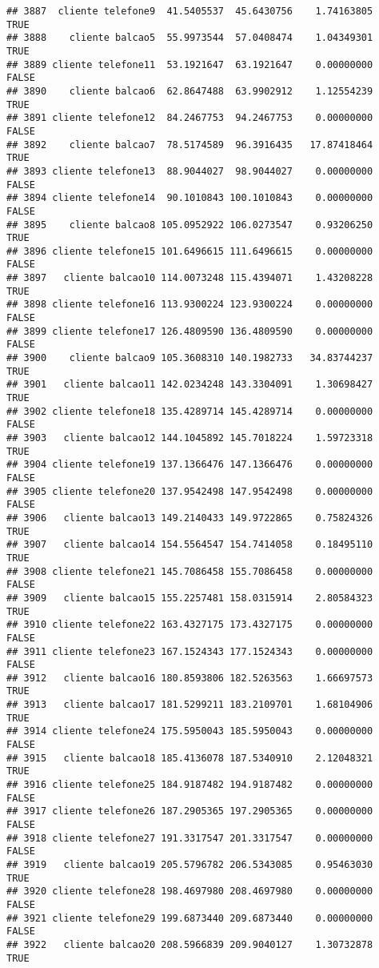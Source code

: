 \documentclass[
]{article}
\begin{document}
\begin{verbatim}
## 3887  cliente telefone9  41.5405537  45.6430756    1.74163805     TRUE
## 3888    cliente balcao5  55.9973544  57.0408474    1.04349301     TRUE
## 3889 cliente telefone11  53.1921647  63.1921647    0.00000000    FALSE
## 3890    cliente balcao6  62.8647488  63.9902912    1.12554239     TRUE
## 3891 cliente telefone12  84.2467753  94.2467753    0.00000000    FALSE
## 3892    cliente balcao7  78.5174589  96.3916435   17.87418464     TRUE
## 3893 cliente telefone13  88.9044027  98.9044027    0.00000000    FALSE
## 3894 cliente telefone14  90.1010843 100.1010843    0.00000000    FALSE
## 3895    cliente balcao8 105.0952922 106.0273547    0.93206250     TRUE
## 3896 cliente telefone15 101.6496615 111.6496615    0.00000000    FALSE
## 3897   cliente balcao10 114.0073248 115.4394071    1.43208228     TRUE
## 3898 cliente telefone16 113.9300224 123.9300224    0.00000000    FALSE
## 3899 cliente telefone17 126.4809590 136.4809590    0.00000000    FALSE
## 3900    cliente balcao9 105.3608310 140.1982733   34.83744237     TRUE
## 3901   cliente balcao11 142.0234248 143.3304091    1.30698427     TRUE
## 3902 cliente telefone18 135.4289714 145.4289714    0.00000000    FALSE
## 3903   cliente balcao12 144.1045892 145.7018224    1.59723318     TRUE
## 3904 cliente telefone19 137.1366476 147.1366476    0.00000000    FALSE
## 3905 cliente telefone20 137.9542498 147.9542498    0.00000000    FALSE
## 3906   cliente balcao13 149.2140433 149.9722865    0.75824326     TRUE
## 3907   cliente balcao14 154.5564547 154.7414058    0.18495110     TRUE
## 3908 cliente telefone21 145.7086458 155.7086458    0.00000000    FALSE
## 3909   cliente balcao15 155.2257481 158.0315914    2.80584323     TRUE
## 3910 cliente telefone22 163.4327175 173.4327175    0.00000000    FALSE
## 3911 cliente telefone23 167.1524343 177.1524343    0.00000000    FALSE
## 3912   cliente balcao16 180.8593806 182.5263563    1.66697573     TRUE
## 3913   cliente balcao17 181.5299211 183.2109701    1.68104906     TRUE
## 3914 cliente telefone24 175.5950043 185.5950043    0.00000000    FALSE
## 3915   cliente balcao18 185.4136078 187.5340910    2.12048321     TRUE
## 3916 cliente telefone25 184.9187482 194.9187482    0.00000000    FALSE
## 3917 cliente telefone26 187.2905365 197.2905365    0.00000000    FALSE
## 3918 cliente telefone27 191.3317547 201.3317547    0.00000000    FALSE
## 3919   cliente balcao19 205.5796782 206.5343085    0.95463030     TRUE
## 3920 cliente telefone28 198.4697980 208.4697980    0.00000000    FALSE
## 3921 cliente telefone29 199.6873440 209.6873440    0.00000000    FALSE
## 3922   cliente balcao20 208.5966839 209.9040127    1.30732878     TRUE

\end{verbatim}
\end{document}
